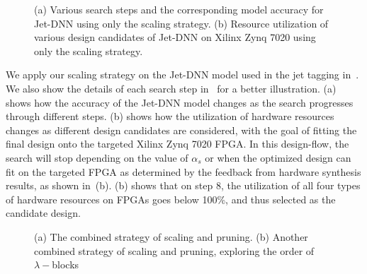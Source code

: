 
\begin{figure} 
   \centering
   \hspace*{\fill}
    
  \caption{(a) Various search steps and the corresponding model accuracy for Jet-DNN using only the scaling strategy. (b) Resource utilization of various design candidates of Jet-DNN on Xilinx Zynq 7020 using only the scaling strategy.  }
  \label{fig:scaling_results} 
\end{figure}


We apply our scaling strategy on the Jet-DNN model used in the jet tagging in~\cite{duarte2018fast, coelho2021automatic}. We also show the details of each search step in~ for a better illustration. (a) shows how the accuracy of the Jet-DNN model changes as the search progresses through different steps. (b) shows how the utilization of hardware resources changes as different design candidates are considered, with the goal of fitting the final design onto the targeted Xilinx Zynq 7020 FPGA.
In this design-flow, the search will stop depending on the value of $\alpha_s$ or when the optimized design can fit on the targeted FPGA as determined by the feedback from hardware synthesis results, as shown in~(b). (b) shows that on step 8, the utilization of all four types of hardware resources on FPGAs goes below 100\%, and thus selected as the candidate design.

\begin{figure} 
   \centering
   \hspace*{\fill}
  \hspace*{\fill}
  \hspace*{\fill}
  \vspace{0.2cm}
  \caption{(a) The combined strategy of scaling and pruning. (b) Another combined strategy of scaling and pruning, exploring the order of $\lambda-$blocks  }
  \label{fig:scaling_pruning_strategy} 
\end{figure}

